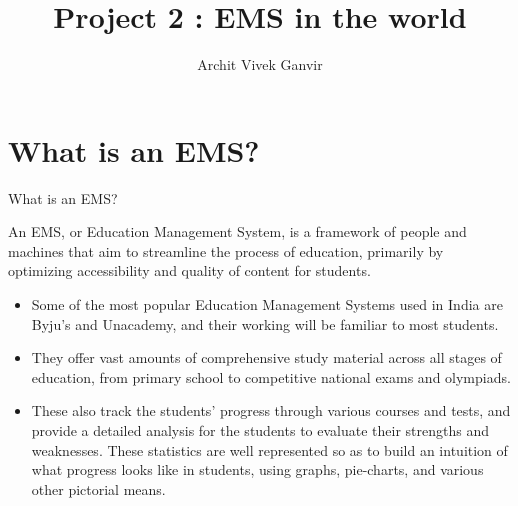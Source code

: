 \documentclass{beamer}
\begin{document}
\newcommand{\bfr}[2]{\section{#1} \begin{frame}{#1} #2 \end{frame}}

\title{Project 2 : EMS in the world}
		\author{ Archit Vivek Ganvir}

	\begin{frame}
    		\titlepage 
	\end{frame}
	
	\begin{frame}
		\tableofcontents
	\end{frame}

\bfr{What is an EMS?}{

An EMS, or Education Management System, is a framework of people and machines that aim to streamline the process of education, primarily by optimizing accessibility and quality of content for students.

\begin{itemize}
    \item Some of the most popular Education Management Systems used in India are Byju's and Unacademy, and their working will be familiar to most students. 

    \item They offer vast amounts of comprehensive study material across all stages of education, from primary school to competitive national exams and olympiads.

    \item These also track the students' progress through various courses and tests, and provide a detailed analysis for the students to evaluate their strengths and weaknesses. These statistics are well represented so as to build an intuition of what progress looks like in students, using graphs, pie-charts, and various other pictorial means.

\end{itemize}

}
\end{document}
